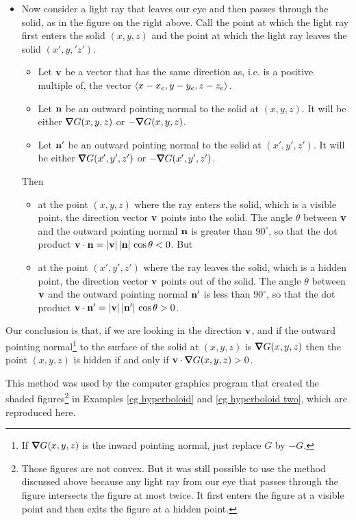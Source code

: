\begin{eg}
\begin{itemize}
\item
Now consider a light ray that leaves our eye and then passes through
the solid, as in the figure on the right above. Call the point at which the light ray first enters the solid $(x,y,z)$ and the point at which the light ray leaves the solid $(x',y,'z')$. 
\begin{itemize}
\item
Let $\mathbf{v}$ be a vector that has the same direction
as, i.e. is a positive multiple of, the vector $\left< x-x_e, y-y_e, z-z_e\right>$.
\item 
Let $\mathbf{n}$ be an outward pointing normal to the solid at $(x,y,z)$.
It will be either $\vnabla G(x,y,z)$ or $-\vnabla G(x,y,z)$.
\item 
Let $\mathbf{n}'$ be an outward pointing normal to the solid at $(x',y',z')$.
It will be either $\vnabla G(x',y',z')$ or $-\vnabla G(x',y',z')$.   
\end{itemize} 
Then
\begin{itemize}
\item
at the point $(x,y,z)$ where the ray enters the solid, which is a visible point,
the direction vector $\mathbf{v}$ points into the solid. The angle $\theta$ between $\mathbf{v}$ and the outward pointing normal $\mathbf{n}$ is greater than $90^\circ$, so that the dot product $\mathbf{v}\cdot\mathbf{n}=|\mathbf{v}|\,|\mathbf{n}|\,\cos\theta <0$. But
\item
at the point $(x',y',z')$ where the ray leaves the solid, which is a 
hidden point, the direction vector $\mathbf{v}$ points out of the solid. The angle $\theta$ between $\mathbf{v}$ and the outward pointing normal $\mathbf{n}'$ is less than $90^\circ$, 
so that the dot product $\mathbf{v}\cdot\mathbf{n}'=|\mathbf{v}|\,|\mathbf{n}'|\,\cos\theta >0$.
\end{itemize}
\end{itemize}
Our conclusion is that, if we are looking in the direction $\mathbf{v}$,
and if the outward pointing normal\footnote{If $\vnabla G(x,y,z)$ is the 
inward pointing normal, just replace $G$ by $-G$. } to the surface of the 
solid at $(x,y,z)$ is $\vnabla G(x,y,z)$ then the point $(x,y,z)$ is hidden 
if and only if $\vv\cdot\vnabla G(x,y,z)>0$.

This method was used by the computer graphics program that created the
shaded figures\footnote{Those figures are not convex. But it was still possible to use the method discussed above because any light ray from our eye that passes through the figure intersects the figure at most twice. It first enters the figure at a visible point and then exits the figure at a hidden point.} in 
Examples  \ref{eg hyperboloid} and \ref{eg hyperboloid two}, which are reproduced here.


\end{eg}
